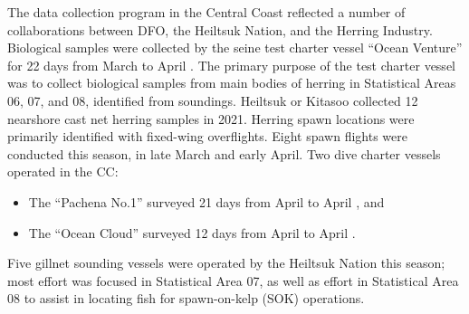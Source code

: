 The data collection program in the Central Coast reflected a number of
collaborations between DFO, the Heiltsuk Nation, and the Herring Industry.
Biological samples were collected by the seine test charter vessel ``Ocean Venture''
for 22 days from March  to April .
The primary purpose of the test charter vessel was to collect biological samples
from main bodies of herring in Statistical Areas 06, 07, and 08, identified from soundings.
Heiltsuk or Kitasoo collected 12 nearshore cast net herring samples in 2021.
Herring spawn locations were primarily identified with fixed-wing overflights.
Eight spawn flights were conducted this season, in late March and early April.
Two dive charter vessels operated in the CC:
\begin{itemize}
\item The ``Pachena No.1'' surveyed 21 days from April  to April , and
\item The ``Ocean Cloud'' surveyed 12 days from April  to April .
\end{itemize}
Five gillnet sounding vessels were operated by the Heiltsuk Nation this season;
most effort was focused in Statistical Area 07, as well as
effort in Statistical Area 08 to assist in locating fish
for spawn-on-kelp (SOK) operations.
